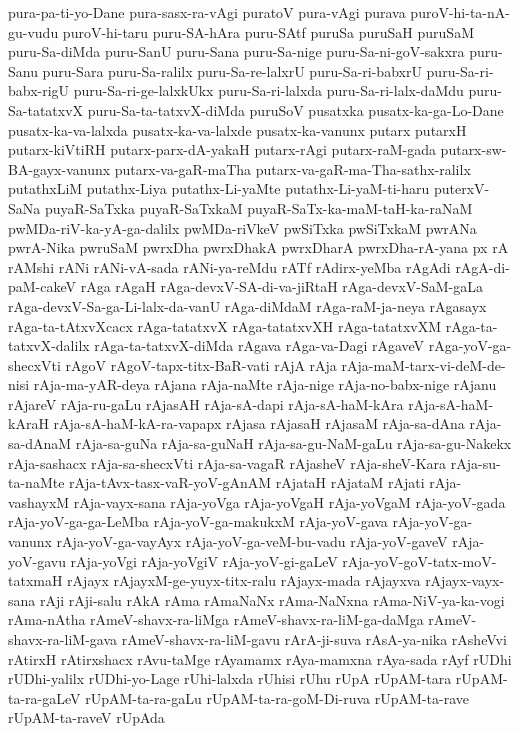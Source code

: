 {pura-pa-ti-yo-Dane
pura-sasx-ra-vAgi
puratoV
pura-vAgi
purava
puroV-hi-ta-nA-gu-vudu
puroV-hi-taru
puru-SA-hAra
puru-SAtf
puruSa
puruSaH
puruSaM
puru-Sa-diMda
puru-SanU
puru-Sana
puru-Sa-nige
puru-Sa-ni-goV-sakxra
puru-Sanu
puru-Sara
puru-Sa-ralilx
puru-Sa-re-lalxrU
puru-Sa-ri-babxrU
puru-Sa-ri-babx-rigU
puru-Sa-ri-ge-lalxkUkx
puru-Sa-ri-lalxda
puru-Sa-ri-lalx-daMdu
puru-Sa-tatatxvX
puru-Sa-ta-tatxvX-diMda
puruSoV
pusatxka
pusatx-ka-ga-Lo-Dane
pusatx-ka-va-lalxda
pusatx-ka-va-lalxde
pusatx-ka-vanunx
putarx
putarxH
putarx-kiVtiRH
putarx-parx-dA-yakaH
putarx-rAgi
putarx-raM-gada
putarx-sw-BA-gayx-vanunx
putarx-va-gaR-maTha
putarx-va-gaR-ma-Tha-sathx-ralilx
putathxLiM
putathx-Liya
putathx-Li-yaMte
putathx-Li-yaM-ti-haru
puterxV-SaNa
puyaR-SaTxka
puyaR-SaTxkaM
puyaR-SaTx-ka-maM-taH-ka-raNaM
pwMDa-riV-ka-yA-ga-dalilx
pwMDa-riVkeV
pwSiTxka
pwSiTxkaM
pwrANa
pwrA-Nika
pwruSaM
pwrxDha
pwrxDhakA
pwrxDharA
pwrxDha-rA-yana
px
rA
rAMshi
rANi
rANi-vA-sada
rANi-ya-reMdu
rATf
rAdirx-yeMba
rAgAdi
rAgA-di-paM-cakeV
rAga
rAgaH
rAga-devxV-SA-di-va-jiRtaH
rAga-devxV-SaM-gaLa
rAga-devxV-Sa-ga-Li-lalx-da-vanU
rAga-diMdaM
rAga-raM-ja-neya
rAgasayx
rAga-ta-tAtxvXcacx
rAga-tatatxvX
rAga-tatatxvXH
rAga-tatatxvXM
rAga-ta-tatxvX-dalilx
rAga-ta-tatxvX-diMda
rAgava
rAga-va-Dagi
rAgaveV
rAga-yoV-ga-shecxVti
rAgoV
rAgoV-tapx-titx-BaR-vati
rAjA
rAja
rAja-maM-tarx-vi-deM-de-nisi
rAja-ma-yAR-deya
rAjana
rAja-naMte
rAja-nige
rAja-no-babx-nige
rAjanu
rAjareV
rAja-ru-gaLu
rAjasAH
rAja-sA-dapi
rAja-sA-haM-kAra
rAja-sA-haM-kAraH
rAja-sA-haM-kA-ra-vapapx
rAjasa
rAjasaH
rAjasaM
rAja-sa-dAna
rAja-sa-dAnaM
rAja-sa-guNa
rAja-sa-guNaH
rAja-sa-gu-NaM-gaLu
rAja-sa-gu-Nakekx
rAja-sashacx
rAja-sa-shecxVti
rAja-sa-vagaR
rAjasheV
rAja-sheV-Kara
rAja-su-ta-naMte
rAja-tAvx-tasx-vaR-yoV-gAnAM
rAjataH
rAjataM
rAjati
rAja-vashayxM
rAja-vayx-sana
rAja-yoVga
rAja-yoVgaH
rAja-yoVgaM
rAja-yoV-gada
rAja-yoV-ga-ga-LeMba
rAja-yoV-ga-makukxM
rAja-yoV-gava
rAja-yoV-ga-vanunx
rAja-yoV-ga-vayAyx
rAja-yoV-ga-veM-bu-vadu
rAja-yoV-gaveV
rAja-yoV-gavu
rAja-yoVgi
rAja-yoVgiV
rAja-yoV-gi-gaLeV
rAja-yoV-goV-tatx-moV-tatxmaH
rAjayx
rAjayxM-ge-yuyx-titx-ralu
rAjayx-mada
rAjayxva
rAjayx-vayx-sana
rAji
rAji-salu
rAkA
rAma
rAmaNaNx
rAma-NaNxna
rAma-NiV-ya-ka-vogi
rAma-nAtha
rAmeV-shavx-ra-liMga
rAmeV-shavx-ra-liM-ga-daMga
rAmeV-shavx-ra-liM-gava
rAmeV-shavx-ra-liM-gavu
rArA-ji-suva
rAsA-ya-nika
rAsheVvi
rAtirxH
rAtirxshacx
rAvu-taMge
rAyamamx
rAya-mamxna
rAya-sada
rAyf
rUDhi
rUDhi-yalilx
rUDhi-yo-Lage
rUhi-lalxda
rUhisi
rUhu
rUpA
rUpAM-tara
rUpAM-ta-ra-gaLeV
rUpAM-ta-ra-gaLu
rUpAM-ta-ra-goM-Di-ruva
rUpAM-ta-rave
rUpAM-ta-raveV
rUpAda
}
